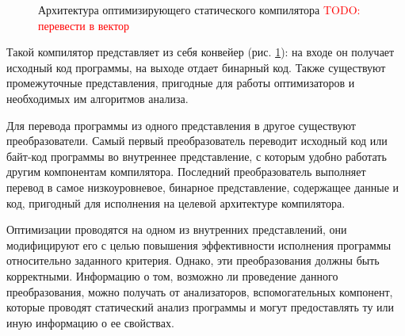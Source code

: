 \documentclass[14pt,titlepage]{extarticle}
\newcommand{\todo}[1]{\textcolor{red}{\eng{TODO}: #1}}
\newcommand{\eng}[1]{{\English#1}}
\begin{document}
      \begin{figure}[!htb]
        \caption{Архитектура оптимизирующего статического компилятора
                 \todo{перевести в вектор}}
        \label{fig:arch}
      \end{figure}

      Такой компилятор представляет из себя конвейер (рис. \ref{fig:arch}): на
      входе он получает исходный код программы, на выходе отдает бинарный код.
      Также существуют промежуточные представления, пригодные для работы
      оптимизаторов и необходимых им алгоритмов анализа.

      Для перевода программы из одного представления в другое существуют
      преобразователи.
      Самый первый преобразователь переводит исходный код или байт-код
      программы во внутреннее представление, с которым удобно работать другим
      компонентам компилятора.
      Последний преобразователь выполняет перевод в самое низкоуровневое,
      бинарное представление, содержащее данные и код, пригодный для исполнения
      на целевой архитектуре компилятора.

      Оптимизации проводятся на одном из внутренних представлений, они
      модифицируют его с целью повышения эффективности исполнения программы
      относительно заданного критерия. Однако, эти преобразования должны быть
      корректными. Информацию о том, возможно ли проведение данного
      преобразования, можно получать от анализаторов, вспомогательных
      компонент, которые проводят статический анализ программы и могут
      предоставлять ту или иную информацию о ее свойствах.
\end{document}
